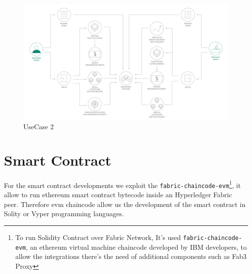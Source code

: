 \begin{figure}[h!]
	\centering
	\includegraphics[totalheight=10cm]{img/use_case2.png}
	\caption{UseCase 2}
	\label{fig:usecase2}
\end{figure}


\newpage
\section{Smart Contract}

For the smart contract developments we exploit the \texttt{fabric-chaincode-evm}\footnote{To run Solidity Contract over Fabric Network, 
It's used \texttt{fabric-chaincode-evm}, an ethereum virtual machine chaincode developed by IBM developers,
to allow the integrations there's the need of additional components such as Fab3 Proxy}, it allow to run ethereum
smart contract bytecode inside an Hyperledger Fabric peer. Therefore evm chaincode allow us the development
of the smart contract in Solity or Vyper programming languages. 
\bigskip

